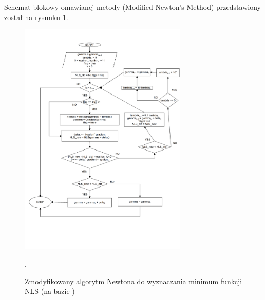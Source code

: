 Schemat blokowy omawianej metody (Modified Newton's Method) przedstawiony został na rysunku \ref{fig:m6_pic_1}.

\begin{figure}[!h]
	\includegraphics[width=8cm]{figures/Module_06/mfn}
	\centering
	\caption{Zmodyfikowany algorytm Newtona do wyznaczania minimum funkcji NLS (na bazie \cite{m6_koay2006a})}.
	\label{fig:m6_pic_1}
\end{figure}